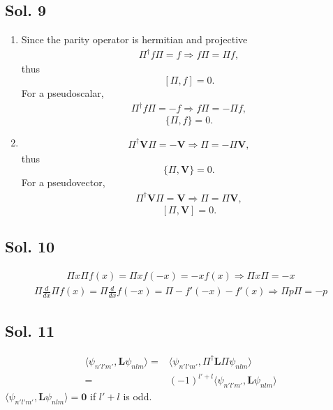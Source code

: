 \subsection*{Sol. 9}
\begin{enumerate}
    \item 
    Since the parity operator is hermitian and projective
    \begin{align*}
        \Pi^\dagger f\Pi = f\Rightarrow 
        f\Pi = \Pi f,
    \end{align*}
    thus $$
    [\Pi, f]=0.
    $$
    For a pseudoscalar, 
    \begin{align*}
        \Pi^\dagger f\Pi = - f\Rightarrow 
        f\Pi = -\Pi f,
    \end{align*}
    $$
    \{\Pi, f\}=0.
    $$
    \item 
    \begin{align*}
        \Pi^\dagger \bm V\Pi = -\bm V\Rightarrow 
        \Pi = -\Pi \bm V,
    \end{align*}
    thus $$
    \{\Pi, \bm V\}=0.
    $$
    For a pseudovector, 
     \begin{align*}
        \Pi^\dagger \bm V\Pi = \bm V\Rightarrow 
        \Pi = \Pi \bm V,
    \end{align*}
    $$
    [\Pi, \bm V]=0.
    $$
\end{enumerate}

\subsection*{Sol. 10}
\begin{align*}
    \Pi x\Pi f(x) = 
    \Pi x f(-x) = 
    -xf(x)\Rightarrow \Pi x\Pi  = -x
\end{align*}
\begin{align*}
    \Pi \frac{d}{dx}\Pi f(x) = 
    \Pi \frac{d}{dx} f(-x) = 
    \Pi -f'(-x)
    -f'(x)\Rightarrow \Pi p\Pi  = -p
\end{align*}

\subsection*{Sol. 11}
\begin{align*}
    \langle \psi_{n'l'm'}, \bm L \psi_{nlm}\rangle =& 
    \langle \psi_{n'l'm'}, \Pi^{\dagger} \bm L \Pi\psi_{nlm}\rangle\\
    =& (-1)^{l'+l}\langle \psi_{n'l'm'}, \bm L \psi_{nlm}\rangle
\end{align*}
$
\langle \psi_{n'l'm'}, \bm L \psi_{nlm}\rangle=\bm 0
$ if $l'+l$ is odd.

